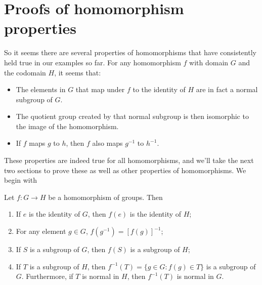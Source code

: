 \section{Proofs of homomorphism properties}
\label{sec:HomomorphismPropertiesProofs}

So it seems there are several properties of homomorphisms that have consistently held true in our examples so far.  
For any  homomorphism $f$ with domain $G$ and the codomain $H$, it seems that:


\begin{itemize}
\item
The elements in $G$ that map under $f$ to the identity of $H$ are in fact a normal subgroup of $G$.
\item
The quotient group created by that normal subgroup is then isomorphic to the image of the homomorphism.
\item
If $f$ maps $g$ to $h$, then $f$ also maps $g^{-1}$ to $h^{-1}$.
\end{itemize}

These properties are indeed true for all homomorphisms, and we'll take the next two sections to prove these as well as other properties of homomorphisms.  
We begin with 
 
\begin{prop}\label{proposition:homomorph:HomorphismSubgroupProp}
Let $f : G \rightarrow H$ be a homomorphism of groups. Then 
\begin{enumerate}
 
\item
If $e$ is the identity of $G$, then $f( e)$ is the identity of
$H$;  
 
\item
For any element $g \in G$, $f( g^{-1}) = [f( g )]^{- 1}$;
 
\item
If $S$ is a subgroup of $G$, then $f(S )$ is a subgroup of
$H$;
 
\item \label{normal_kernel}
If $T$ is a  subgroup of $H$, then $f^{-1}(T) = \{ g \in G :
f(g) \in T \}$ is a subgroup of $G$. Furthermore, if $T$ is
normal in $H$, then $f^{-1}(T)$ is normal in $G$. 
 
\end{enumerate}
\end{prop}
 

